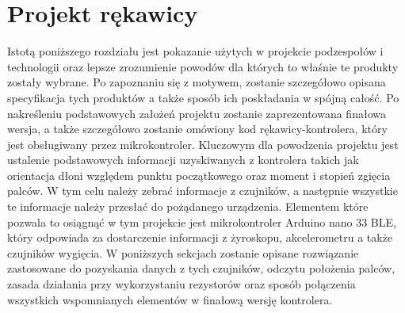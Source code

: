 \chapter[Projekt rękawicy]{Projekt rękawicy\raisebox{.3\baselineskip}{\normalsize\footnotemark}}
\label{ch:projekt}
Istotą poniższego rozdziału jest pokazanie użytych w projekcie podzespołów i technologii oraz lepsze zrozumienie powodów dla których to właśnie te produkty zostały wybrane. Po zapoznaniu się z motywem, zostanie szczegółowo opisana specyfikacja tych produktów a także sposób ich poskładania w spójną całość. Po nakreśleniu podstawowych założeń projektu zostanie zaprezentowana finałowa wersja, a także szczegółowo zostanie omówiony kod rękawicy-kontrolera, który jest obsługiwany przez mikrokontroler. Kluczowym dla powodzenia projektu jest ustalenie podstawowych informacji uzyskiwanych z kontrolera takich jak orientacja dłoni względem punktu początkowego oraz moment i stopień zgięcia palców. W tym celu należy zebrać informacje z czujników, a następnie wszystkie te informacje należy przesłać do pożądanego urządzenia. Elementem które pozwala to osiągnąć w tym projekcie jest mikrokontroler Arduino nano 33 BLE, który odpowiada za dostarczenie informacji z żyroskopu, akcelerometru a także czujników wygięcia. W poniższych sekcjach zostanie opisane rozwiązanie zastosowane do pozyskania danych z tych czujników, odczytu położenia palców, zasada działania przy wykorzystaniu rezystorów oraz sposób połączenia wszystkich wspomnianych elementów w finałową wersję kontrolera.
	
	
